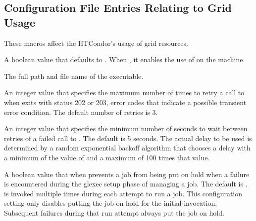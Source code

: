 \subsection{\label{sec:Grid-Config-File-Entries}Configuration File
Entries Relating to Grid Usage}

These macros affect the HTCondor's usage of grid resources.
\begin{description}

\label{param:GlexecJob}
\item[\Macro{GLEXEC\_JOB}]
  A boolean value that defaults to .
  When , it enables the use of  on the machine.

\label{param:Glexec}
\item[\Macro{GLEXEC}]
  The full path and file name of the  executable.

\label{param:GlexecRetries}
\item[\Macro{GLEXEC\_RETRIES}]
An integer value that specifies the maximum number of times to retry a
call to  when  exits with status 202 or 203,
error codes that indicate a possible transient error condition.  The
default number of retries is 3.

\label{param:GlexecRetryDelay}
\item[\Macro{GLEXEC\_RETRY\_DELAY}]
An integer value that specifies the minimum number of seconds to wait
between retries of a failed call to .
The default is 5 seconds.
The actual delay to be used is determined by a random exponential backoff
algorithm that chooses a delay with a minimum of
the value of  
and a maximum of 100 times that value.

\label{param:GlexecHoldOnInitialFailure}
\item[\Macro{GLEXEC\_HOLD\_ON\_INITIAL\_FAILURE}]
A boolean value that when  prevents a job from being put
on hold when a failure is encountered during the glexec setup phase
of managing a job.  The default is .
 is invoked multiple times during each attempt to run a job.
This configuration setting only disables putting the job on hold for the
initial invocation.  Subsequent failures during that run attempt always
put the job on hold.

\end{description}

